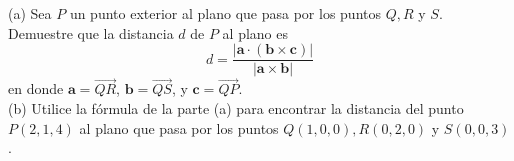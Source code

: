 \item (a) Sea $P$ un punto exterior al plano que pasa por los puntos $Q, R$ y $S$. Demuestre que la distancia $d$ de $P$ al plano es
    \[
    d = \frac{|\mathbf{a} \cdot (\mathbf{b} \times \mathbf{c})|}{|\mathbf{a} \times \mathbf{b}|}
    \]
    en donde $\mathbf{a} = \overrightarrow{QR}$, $\mathbf{b} = \overrightarrow{QS}$, y $\mathbf{c} = \overrightarrow{QP}$. \\
    (b) Utilice la fórmula de la parte (a) para encontrar la distancia del punto $P(2, 1, 4)$ al plano que pasa por los puntos $Q(1, 0, 0), R(0, 2, 0)$ y $S(0, 0, 3)$.
